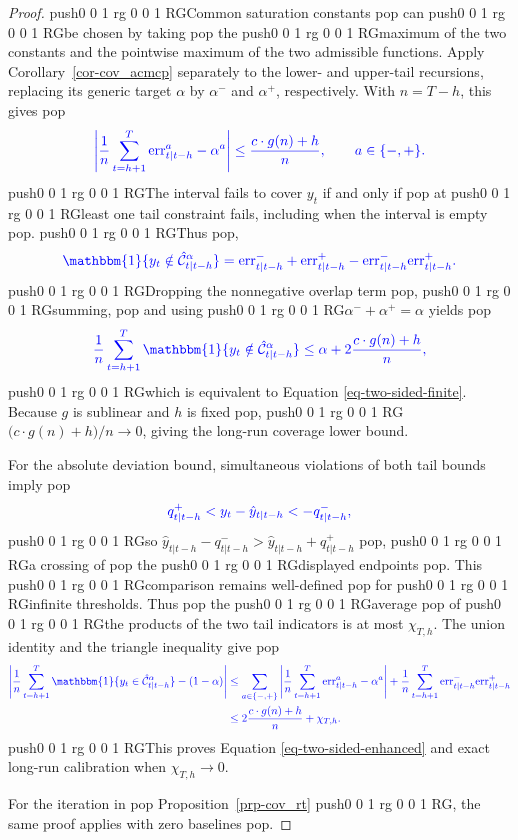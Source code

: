 \documentclass[
  american,
  12pt]{article}
\theoremstyle{plain}
\theoremstyle{plain}
\theoremstyle{remark}
\newcommand{\CPTSadd}[1]{\ifmmode\else\leavevmode\fi\pdfcolorstack 0 push{0 0 1 rg 0 0 1 RG}#1\pdfcolorstack 0 pop}
\begin{document}
\begin{proof}
\CPTSadd{Common saturation constants} can \CPTSadd{be chosen by taking} the \CPTSadd{maximum of the
two constants and the pointwise maximum of the two admissible functions.
Apply Corollary~\ref{cor-cov_acmcp} separately to the lower- and
upper-tail recursions, replacing its generic target \(\alpha\) by
\(\alpha^{-}\) and \(\alpha^{+}\), respectively. With \(n=T-h\), this
gives} \[
\CPTSadd{\left|\frac{1}{n}\sum_{t=h+1}^{T}\mathrm{err}_{t|t-h}^{a}-\alpha^{a}\right|\leq \frac{c\cdot g(n)+h}{n},
\qquad a\in\{-,+\}.}
\] \CPTSadd{The interval fails to cover \(y_t\) if and only if} at \CPTSadd{least one tail
constraint fails, including when the interval is empty}. \CPTSadd{Thus}, \[
\CPTSadd{\mathbbm{1}\{y_t\notin\hat{\mathcal C}_{t|t-h}^{\alpha}\}
=\mathrm{err}_{t|t-h}^{-}+\mathrm{err}_{t|t-h}^{+}-\mathrm{err}_{t|t-h}^{-}\mathrm{err}_{t|t-h}^{+}.}
\] \CPTSadd{Dropping the nonnegative overlap term}, \CPTSadd{summing,} and using
\CPTSadd{\(\alpha^{-}+\alpha^{+}=\alpha\) yields} \[
\CPTSadd{\frac{1}{n}\sum_{t=h+1}^{T}\mathbbm{1}\{y_t\notin\hat{\mathcal C}_{t|t-h}^{\alpha}\}
\leq \alpha+2\frac{c\cdot g(n)+h}{n},}
\] \CPTSadd{which is equivalent to Equation \eqref{eq-two-sided-finite}. Because
\(g\) is sublinear and \(h\) is fixed},
\CPTSadd{\(\bigl(c\cdot g(n)+h\bigr)/n\to0\), giving the long-run coverage lower
bound.

For the absolute deviation bound, simultaneous violations of both tail
bounds imply} \[
\CPTSadd{q_{t|t-h}^{+}<y_t-\hat y_{t|t-h}< -q_{t|t-h}^{-},}
\] \CPTSadd{so \(\hat y_{t|t-h}-q_{t|t-h}^{-}>\hat y_{t|t-h}+q_{t|t-h}^{+}\)}, \CPTSadd{a
crossing of} the \CPTSadd{displayed endpoints}. This \CPTSadd{comparison remains
well-defined} for \CPTSadd{infinite thresholds. Thus} the \CPTSadd{average} of \CPTSadd{the products
of the two tail indicators is at most \(\chi_{T,h}\). The union identity
and the triangle inequality give} \[
\CPTSadd{\begin{aligned}
\left|\frac1n\sum_{t=h+1}^{T}\mathbbm{1}\{y_t\in\hat{\mathcal C}_{t|t-h}^{\alpha}\}-(1-\alpha)\right|
&\leq\sum_{a\in\{-,+\}}\left|\frac1n\sum_{t=h+1}^{T}\mathrm{err}_{t|t-h}^{a}-\alpha^a\right|
+\frac1n\sum_{t=h+1}^{T}\mathrm{err}_{t|t-h}^{-}\mathrm{err}_{t|t-h}^{+}\\
&\leq2\frac{c\cdot g(n)+h}{n}+\chi_{T,h}.
\end{aligned}}
\] \CPTSadd{This proves Equation \eqref{eq-two-sided-enhanced} and exact long-run
calibration when \(\chi_{T,h}\to0\).

For the iteration in} Proposition~\ref{prp-cov_rt}\CPTSadd{, the same proof
applies with zero baselines}.
\end{proof}
\end{document}
